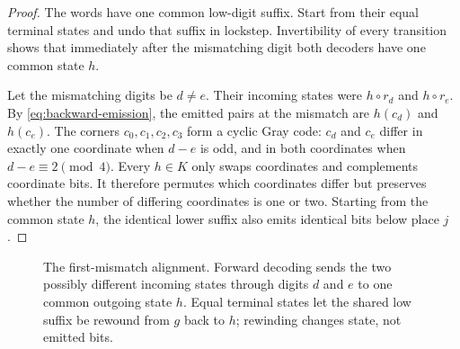 \documentclass[11pt]{article}
\theoremstyle{definition}
\theoremstyle{remark}
\begin{document}
\begin{proof}
The words have one common low-digit suffix.  Start from their equal terminal
states and undo that suffix in lockstep.  Invertibility of every transition
shows that immediately after the mismatching digit both decoders have one
common state $h$.

Let the mismatching digits be $d\neq e$.  Their incoming states were
$h\circ r_d$ and $h\circ r_e$.  By
\eqref{eq:backward-emission}, the emitted pairs at the mismatch are
$h(c_d)$ and $h(c_e)$.  The corners $c_0,c_1,c_2,c_3$ form a cyclic Gray
code: $c_d$ and $c_e$ differ in exactly one coordinate when $d-e$ is odd,
and in both coordinates when $d-e\equiv2\pmod4$.  Every $h\in K$ only swaps
coordinates and complements coordinate bits.  It therefore permutes which
coordinates differ but preserves whether the number of differing coordinates
is one or two.  Starting from the common state $h$, the identical lower suffix
also emits identical bits below place $j$.
\end{proof}
\begin{figure}[htbp]
\centering
{}
\caption{The first-mismatch alignment.  Forward decoding sends the two
possibly different incoming states through digits $d$ and $e$ to one common
outgoing state $h$.  Equal terminal states let the shared low suffix be
rewound from $g$ back to $h$; rewinding changes state, not emitted bits.}
\label{fig:first-mismatch}
\end{figure}
\end{document}
